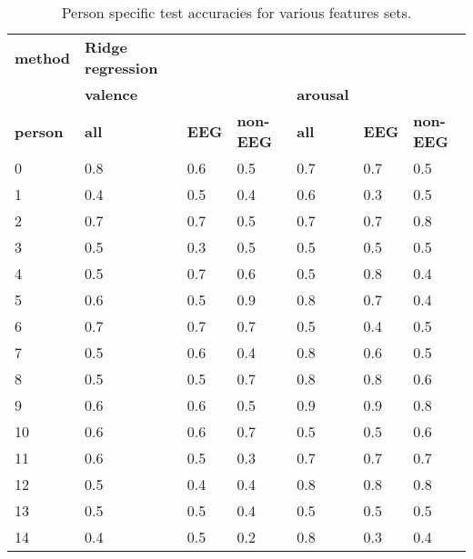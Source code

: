 \begin{table}[]
\centering
\caption{Person specific test accuracies for various features sets.}
\begin{tabular}{l|lll|lll}
\textbf{method}          & \textbf{Ridge regression}    &           &         &         &     &         \\
                & \textbf{valence}              &           &         & \textbf{arousal} &     &         \\
\textbf{person}          & \textbf{all}                  & \textbf{EEG}       & \textbf{non-EEG} & \textbf{all}     & \textbf{EEG} & \textbf{non-EEG} \\ \hline 
 0               & 0.8                  & 0.6       & 0.5     & 0.7     & 0.7 & 0.5     \\
1               & 0.4                  & 0.5       & 0.4     & 0.6     & 0.3 & 0.5     \\
2               & 0.7                  & 0.7       & 0.5     & 0.7     & 0.7 & 0.8     \\
3               & 0.5                  & 0.3       & 0.5     & 0.5     & 0.5 & 0.5     \\
4               & 0.5                  & 0.7       & 0.6     & 0.5     & 0.8 & 0.4     \\
5               & 0.6                  & 0.5       & 0.9     & 0.8     & 0.7 & 0.4     \\
6               & 0.7                  & 0.7       & 0.7     & 0.5     & 0.4 & 0.5     \\
7               & 0.5                  & 0.6       & 0.4     & 0.8     & 0.6 & 0.5     \\
8               & 0.5                  & 0.5       & 0.7     & 0.8     & 0.8 & 0.6     \\
9               & 0.6                  & 0.6       & 0.5     & 0.9     & 0.9 & 0.8     \\
10              & 0.6                  & 0.6       & 0.7     & 0.5     & 0.5 & 0.6     \\
11              & 0.6                  & 0.5       & 0.3     & 0.7     & 0.7 & 0.7     \\
12              & 0.5                  & 0.4       & 0.4     & 0.8     & 0.8 & 0.8     \\
13              & 0.5                  & 0.5       & 0.4     & 0.5     & 0.5 & 0.5     \\
14              & 0.4                  & 0.5       & 0.2     & 0.8     & 0.3 & 0.4     \\

\end{tabular}
\end{table}
